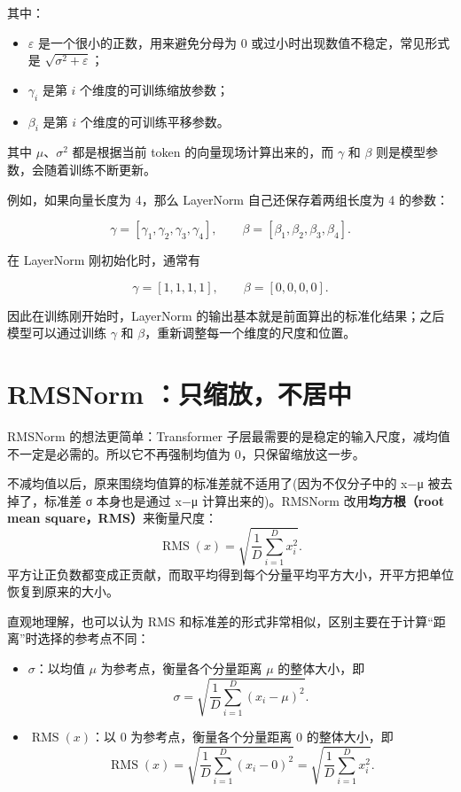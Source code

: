 \documentclass[UTF8,11pt,a4paper]{ctexart}
\begin{document}
其中：

\begin{itemize}[leftmargin=2em]
    \item $\varepsilon$ 是一个很小的正数，用来避免分母为 0 或过小时出现数值不稳定，常见形式是 $\sqrt{\sigma^2+\varepsilon}$；
    \item $\gamma_i$ 是第 $i$ 个维度的可训练缩放参数；
    \item $\beta_i$ 是第 $i$ 个维度的可训练平移参数。
\end{itemize}

其中 $\mu$、$\sigma^2$ 都是根据当前 token 的向量现场计算出来的，而 $\gamma$ 和 $\beta$ 则是模型参数，会随着训练不断更新。

例如，如果向量长度为 4，那么 LayerNorm 自己还保存着两组长度为 4 的参数：

\[
\gamma=[\gamma_1,\gamma_2,\gamma_3,\gamma_4],
\qquad
\beta=[\beta_1,\beta_2,\beta_3,\beta_4].
\]

在 LayerNorm 刚初始化时，通常有

\[
\gamma=[1,1,1,1],
\qquad
\beta=[0,0,0,0].
\]

因此在训练刚开始时，LayerNorm 的输出基本就是前面算出的标准化结果；之后模型可以通过训练 $\gamma$ 和 $\beta$，重新调整每一个维度的尺度和位置。
\section{RMSNorm ：只缩放，不居中}

RMSNorm 的想法更简单：Transformer 子层最需要的是稳定的输入尺度，减均值不一定是必需的。所以它不再强制均值为 0，只保留缩放这一步。

不减均值以后，原来围绕均值算的标准差就不适用了(因为不仅分子中的 x−μ 被去掉了，标准差 σ 本身也是通过 x−μ 计算出来的)。RMSNorm 改用\textbf{均方根（root mean square，RMS）}来衡量尺度：
\[
\operatorname{RMS}(x)
=\sqrt{\frac{1}{D}\sum_{i=1}^{D}x_i^2}.
\]
平方让正负数都变成正贡献，而取平均得到每个分量平均平方大小，开平方把单位恢复到原来的大小。

直观地理解，也可以认为 RMS 和标准差的形式非常相似，区别主要在于计算“距离”时选择的参考点不同：

\begin{itemize}[leftmargin=2em]
    \item $\sigma$：以均值 $\mu$ 为参考点，衡量各个分量距离 $\mu$ 的整体大小，即
    \[
    \sigma
    =
    \sqrt{\frac{1}{D}\sum_{i=1}^{D}(x_i-\mu)^2}.
    \]

    \item $\operatorname{RMS}(x)$：以 $0$ 为参考点，衡量各个分量距离 $0$ 的整体大小，即
    \[
    \operatorname{RMS}(x)
    =
    \sqrt{\frac{1}{D}\sum_{i=1}^{D}(x_i-0)^2}
    =
    \sqrt{\frac{1}{D}\sum_{i=1}^{D}x_i^2}.
    \]
\end{itemize}
\end{document}
